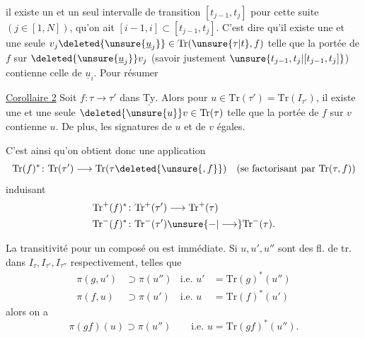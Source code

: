 il existe un et un seul intervalle de transition
 $[t_{j-1},t_j]$ pour cette suite $(j\in[1,N])$, 
qu'on ait $[i-1,i]\subset[t_{j-1},t_j]$. C'est dire qu'il
existe une et une seule $v_j\deleted{\unsure{\underline{u}_j}}\in\mathrm{Tr}(\unsure{\tau|t},f)$ telle
que la portée de $f$ sur $\deleted{\unsure{\underline{u}_j}}v_j$ (savoir justement
$\unsure{t_{j-1},t_j|[t_{j-1},t_j]}$) contienne celle de $\underline{u}_i$. Pour résumer

\uline{Corollaire 2} Soit $f\colon\tau\longrightarrow\tau'$ dans $\underline{\mathrm{Ty}}$. Alors
pour  $u\in\mathrm{Tr}(\tau')=\mathrm{Tr}(I_{\tau'})$, il existe une
et une seule $\deleted{\unsure{u}}v\in\mathrm{Tr}(\tau)$ telle que la portée
de $f$ sur $v$ contienne $u$.  De plus, les
signatures de $u$ et de $v$   égales.

C'est ainsi qu'on obtient donc une
application
\[
\mathrm{Tr}(f)^*\colon\mathrm{Tr}(\tau')\longrightarrow\mathrm{Tr}(\tau\deleted{\unsure{,f}})
\quad\text{(se factorisant par $\mathrm{Tr}(\tau,f)$)}
\]
induisant
\[
\begin{aligned}
\mathrm{Tr}^+(f)^*&\colon\mathrm{Tr}^+(\tau')\longrightarrow\mathrm{Tr}^+(\tau)\\
\mathrm{Tr}^-(f)^*&\colon\mathrm{Tr}^-(\tau')\unsure{\mathbin{-}|\longrightarrow}\mathrm{Tr}^-(\tau).
\end{aligned}
\]

La transitivité pour un composé
ou
est immédiate. Si $u,u',u''$ sont des fl. de tr.
dans $I_\tau,I_{\tau'},I_{\tau''}$ respectivement, telles que
\[
\begin{aligned}
\pi(g,u')&\supset\pi(u'') &\text{i.e. } u'&=\mathrm{Tr}(g)^*(u'')\\
\pi(f,u)&\supset\pi(u') &\text{i.e. } u&=\mathrm{Tr}(f)^*(u')
\end{aligned}
\]
alors on a
\[
\pi(gf)(u)\supset\pi(u'')\qquad\text{i.e. }u=\mathrm{Tr}(gf)^*(u'').
\]
